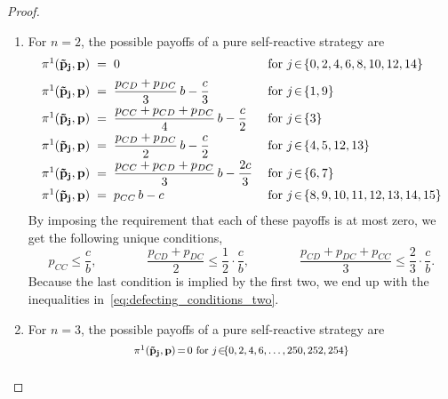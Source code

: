 \documentclass[9pt,twoside,lineno]{pnas-new}
\theoremstyle{plainCl1}
\theoremstyle{plainCl2}
\begin{document}
\begin{proof}
\begin{enumerate}
\item For $n\!=\!2$, the possible payoffs of a pure self-reactive strategy are
\begin{equation*}\label{Eq:PayoffExpressionsDefectiveReactiveTwo}
\setlength{\arraycolsep}{1mm}
  \begin{array}{lcll}
   \pi^1(\mathbf{\tilde p_j},\mathbf{p}) &= &\displaystyle 0 & ~~\text{for}~ j\! \in\!  \{0, 2, 4, 6, 8, 10, 12, 14\} \\[0.2cm]
   \pi^1(\mathbf{\tilde p_j},\mathbf{p}) &= &\displaystyle  \frac{p_{CD} + p_{DC}}{3}\,b - \frac{c}{3}  & ~~\text{for}~ j\! \in\!  \{1, 9\} \\[0.2cm]
   \pi^1(\mathbf{\tilde p_j},\mathbf{p}) &= &\displaystyle  \frac{p_{CC} + p_{CD} + p_{DC}}{4}\,b - \frac{c}{2} & ~~\text{for}~ j\! \in\!  \{3\} \\[0.2cm]
   \pi^1(\mathbf{\tilde p_j},\mathbf{p}) &= &\displaystyle  \frac{p_{CD} + p_{DC}}{2}\,b - \frac{c}{2}  & ~~\text{for}~ j\! \in\!  \{4, 5, 12, 13\} \\[0.2cm]
   \pi^1(\mathbf{\tilde p_j},\mathbf{p}) &= &\displaystyle  \frac{p_{CC} + p_{CD} + p_{DC}}{3}\,b - \frac{2 c}{3}  & ~~\text{for}~ j\! \in\!  \{6, 7\}\\[0.2cm]
   \pi^1(\mathbf{\tilde p_j},\mathbf{p}) &= &\displaystyle  p_{CC}\,b - c & ~~\text{for}~ j\! \in\!  \{8, 9, 10, 11, 12, 13, 14, 15\}
  \end{array}
\end{equation*}
By imposing the requirement that each of these payoffs is at most zero, we get the following unique conditions,
\begin{equation*}
  p_{CC}  \le \frac{c}{b}, \qquad \qquad
 \frac{p_{CD} + p_{DC}}{2}  \le \frac{1}{2} \cdot  \frac{c}{b}, \qquad \qquad
  \frac{p_{CD} + p_{DC} + p_{CC}}{3} \le	\frac{2}{3} \cdot \frac{c}{b}.
 \end{equation*}
Because the last condition is implied by the first two, we end up with the
inequalities in~\eqref{eq:defecting_conditions_two}.\\

\item For $n\!=\!3$, the possible payoffs of a pure self-reactive strategy are
  \begin{equation*}\label{Eq:PayoffExpressionsReactiveThree}
  \footnotesize
  \setlength{\arraycolsep}{0mm}
  \begin{array}{lclll}
  \pi^1(\mathbf{\tilde p_j},\mathbf{p}) &{\, = \,}
  &\displaystyle 0
  &~\text{for}~ j\! \in\! 
  &\{0, 2, 4, 6, \dots, 250, 252, 254\} \\[0.2cm]
  

\end{array}
\end{equation*}
\end{enumerate}
\end{proof}
\end{document}
